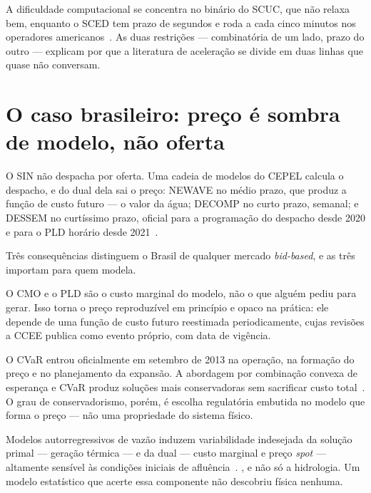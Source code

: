 \documentclass[10pt,a4paper,oneside]{book}
\begin{document}
\vspace{0.6em}
A dificuldade computacional se concentra no binário do SCUC, que não relaxa
bem, enquanto o SCED tem prazo de segundos e roda a cada cinco minutos nos
operadores americanos~\cite{chen2022}. As duas restrições --- combinatória de
um lado, prazo do outro --- explicam por que a literatura de aceleração se
divide em duas linhas que quase não conversam.

\section*{O caso brasileiro: preço é sombra de modelo, não oferta}

O SIN não despacha por oferta. Uma cadeia de modelos do CEPEL calcula o
despacho, e do dual dela sai o preço: NEWAVE no médio prazo, que produz a
função de custo futuro --- o valor da água; DECOMP no curto prazo, semanal; e
DESSEM no curtíssimo prazo, oficial para a programação do despacho desde 2020 e
para o PLD horário desde 2021~\cite{cepel2026,ccee2026}.

Três consequências distinguem o Brasil de qualquer mercado \emph{bid-based}, e
as três importam para quem modela.

O CMO e o PLD são o custo marginal do modelo, não o que alguém pediu para
gerar. Isso torna o preço reproduzível em princípio e opaco na prática: ele
depende de uma função de custo futuro reestimada periodicamente, cujas revisões
a CCEE publica como evento próprio, com data de vigência.

O CVaR entrou oficialmente em setembro de 2013 na operação, na formação do
preço e no planejamento da expansão. A abordagem por combinação convexa de
esperança e CVaR produz soluções mais conservadoras sem sacrificar custo
total~\cite{maceira2015}. O grau de conservadorismo, porém, é escolha
regulatória embutida no modelo que forma o preço --- não uma propriedade do
sistema físico.

Modelos autorregressivos de vazão induzem variabilidade indesejada da solução
primal --- geração térmica --- e da dual --- custo marginal e preço
\emph{spot} --- altamente sensível às condições iniciais de
afluência~\cite{soares2017}. , e não só a hidrologia. Um modelo estatístico
que acerte essa componente não descobriu física nenhuma.
\end{document}
